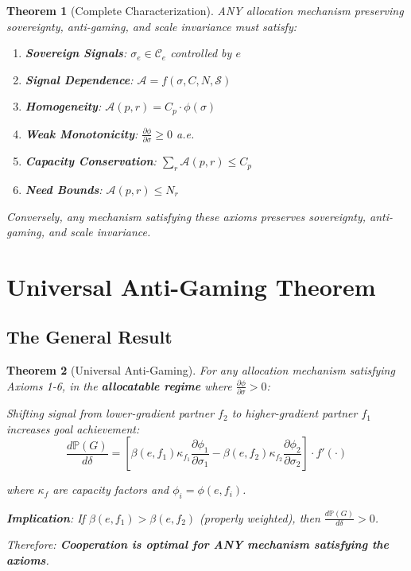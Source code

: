 \documentclass[11pt,a4paper]{article}
\newtheorem{theorem}{Theorem}[section]
\theoremstyle{definition}
\theoremstyle{remark}
\begin{document}
\begin{theorem}[Complete Characterization]
ANY allocation mechanism preserving sovereignty, anti-gaming, and scale invariance must satisfy:

\begin{enumerate}
\item \textbf{Sovereign Signals}: $\sigma_e \in \mathcal{C}_e$ controlled by $e$
\item \textbf{Signal Dependence}: $\mathcal{A} = f(\sigma, C, N, \mathcal{S})$
\item \textbf{Homogeneity}: $\mathcal{A}(p,r) = C_p \cdot \phi(\sigma)$
\item \textbf{Weak Monotonicity}: $\frac{\partial \phi}{\partial \sigma} \ge 0$ a.e.
\item \textbf{Capacity Conservation}: $\sum_r \mathcal{A}(p,r) \le C_p$
\item \textbf{Need Bounds}: $\mathcal{A}(p,r) \le N_r$
\end{enumerate}

Conversely, any mechanism satisfying these axioms preserves sovereignty, anti-gaming, and scale invariance.
\end{theorem}

\section{Universal Anti-Gaming Theorem}

\subsection{The General Result}

\begin{theorem}[Universal Anti-Gaming]
For any allocation mechanism satisfying Axioms 1-6, in the \textbf{allocatable regime} where $\frac{\partial \phi}{\partial \sigma} > 0$:

Shifting signal from lower-gradient partner $f_2$ to higher-gradient partner $f_1$ increases goal achievement:
\[ \frac{d\mathbb{P}(G)}{d\delta} = \left[\beta(e,f_1) \kappa_{f_1} \frac{\partial \phi_1}{\partial \sigma_1} - \beta(e,f_2) \kappa_{f_2} \frac{\partial \phi_2}{\partial \sigma_2}\right] \cdot f'(\cdot) \]

where $\kappa_f$ are capacity factors and $\phi_i = \phi(e,f_i)$.

\textbf{Implication}: If $\beta(e,f_1) > \beta(e,f_2)$ (properly weighted), then $\frac{d\mathbb{P}(G)}{d\delta} > 0$.

Therefore: \textbf{Cooperation is optimal for ANY mechanism satisfying the axioms}.
\end{theorem}
\end{document}
